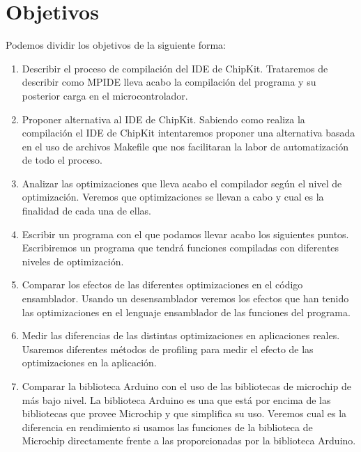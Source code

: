 \section{Objetivos}
Podemos dividir los objetivos de la siguiente forma:
\begin{enumerate}
    \item Describir el proceso de compilación del IDE de ChipKit. Trataremos de describir como MPIDE lleva acabo la compilación del programa y su posterior carga en el microcontrolador.
    \item Proponer alternativa al IDE de ChipKit. Sabiendo como realiza la compilación el IDE de ChipKit intentaremos proponer una alternativa basada en el uso de archivos Makefile que nos facilitaran la labor de automatización de todo el proceso.
    \item Analizar las optimizaciones que lleva acabo el compilador según el nivel de optimización. Veremos que optimizaciones se llevan a cabo y cual es la finalidad de cada una de ellas.
    \item Escribir un programa con el que podamos llevar acabo los siguientes puntos. Escribiremos un programa que tendrá funciones compiladas con diferentes niveles de optimización.
    \item Comparar los efectos de las diferentes optimizaciones en el código ensamblador. Usando un desensamblador veremos los efectos que han tenido las optimizaciones en el lenguaje ensamblador de las funciones del programa.
    \item Medir las diferencias de las distintas optimizaciones en aplicaciones reales. Usaremos diferentes métodos de profiling para medir el efecto de las optimizaciones en la aplicación.
    \item Comparar la biblioteca Arduino con el uso de las bibliotecas de microchip de más bajo nivel. La biblioteca Arduino es una que está por encima de las bibliotecas que provee Microchip y que simplifica su uso. Veremos cual es la diferencia en rendimiento si usamos las funciones de la biblioteca de Microchip directamente frente a las proporcionadas por la biblioteca Arduino.
\end{enumerate}